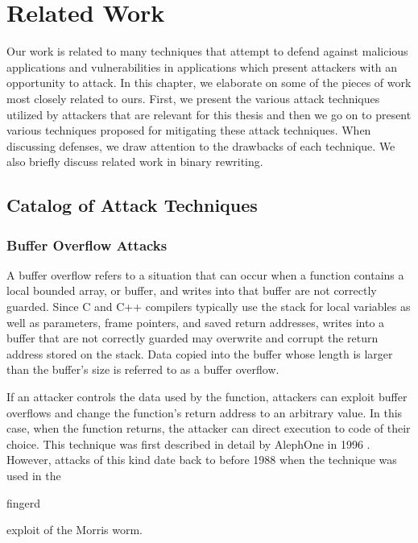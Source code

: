 
\renewcommand{\thechapter}{2}

\chapter{Related Work}

Our work is related to many techniques that attempt to defend against malicious applications and
vulnerabilities in applications which present attackers with an opportunity to attack. In this
chapter, we elaborate on some of the pieces of work most closely related to ours. First, we present
the various attack techniques utilized by attackers that are relevant for this thesis and then we go
on to present various techniques proposed for mitigating these attack techniques. When discussing
defenses, we draw attention to the drawbacks of each technique. We also briefly discuss related work
in binary rewriting.

\section{Catalog of Attack Techniques}

\subsection{Buffer Overflow Attacks}

A buffer overflow refers to a situation that can occur when a function contains a local bounded
array, or buffer, and writes into that buffer are not correctly guarded. Since C and C++ compilers
typically use the stack for local variables as well as parameters, frame pointers, and saved return
addresses, writes into a buffer that are not correctly guarded may overwrite and corrupt the return
address stored on the stack. Data copied into the buffer whose length is larger than the buffer's
size is referred to as a buffer overflow.

If an attacker controls the data used by the function, attackers can exploit buffer overflows and
change the function's return address to an arbitrary value. In this case, when the function returns,
the attacker can direct execution to code of their choice. This technique was first described in
detail by AlephOne in 1996 \cite{}. However, attacks of this kind date back to before 1988 when the
technique was used in the \begin{em}fingerd\end{em} exploit of the Morris worm.

